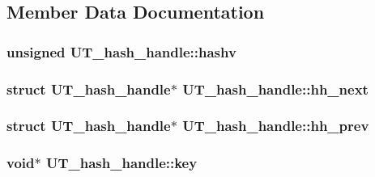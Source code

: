 \subsection{Member Data Documentation}
\subsubsection[{\texorpdfstring{hashv}{hashv}}]{\setlength{\rightskip}{0pt plus 5cm}unsigned U\+T\+\_\+hash\+\_\+handle\+::hashv}\hypertarget{struct_u_t__hash__handle_aae5e635fa110556e5007f627089f8323}{}\label{struct_u_t__hash__handle_aae5e635fa110556e5007f627089f8323}
\subsubsection[{\texorpdfstring{hh\+\_\+next}{hh_next}}]{\setlength{\rightskip}{0pt plus 5cm}struct {\bf U\+T\+\_\+hash\+\_\+handle}$\ast$ U\+T\+\_\+hash\+\_\+handle\+::hh\+\_\+next}\hypertarget{struct_u_t__hash__handle_a4f6989385499ba6f594b0f0facd28325}{}\label{struct_u_t__hash__handle_a4f6989385499ba6f594b0f0facd28325}
\subsubsection[{\texorpdfstring{hh\+\_\+prev}{hh_prev}}]{\setlength{\rightskip}{0pt plus 5cm}struct {\bf U\+T\+\_\+hash\+\_\+handle}$\ast$ U\+T\+\_\+hash\+\_\+handle\+::hh\+\_\+prev}\hypertarget{struct_u_t__hash__handle_a3ec03e34d7975d5c1981c44b324619b2}{}\label{struct_u_t__hash__handle_a3ec03e34d7975d5c1981c44b324619b2}
\subsubsection[{\texorpdfstring{key}{key}}]{\setlength{\rightskip}{0pt plus 5cm}void$\ast$ U\+T\+\_\+hash\+\_\+handle\+::key}\hypertarget{struct_u_t__hash__handle_a40690fc15aeaeba8f25385f05f84dd4d}{}\label{struct_u_t__hash__handle_a40690fc15aeaeba8f25385f05f84dd4d}
